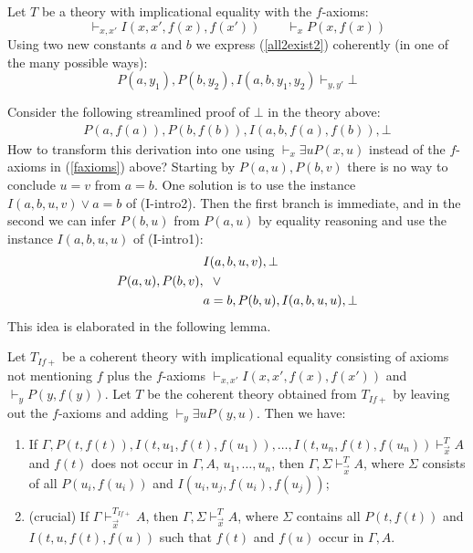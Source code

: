 \documentclass[10pt,a4paper]{article}
\begin{document}
\begin{example}\label{exa:counter2CL}
Let $T$  be a theory with implicational equality with the $f$-axioms:
\begin{equation}\label{faxioms}
\vdash_{x,x'} I(x,x',f(x),f(x') )\quad\quad \vdash_{x} P(x,f(x))
\end{equation}
Using two new constants $a$ and $b$ we express (\ref{all2exist2}) coherently
(in one of the many possible ways):
\[
P(a,y_1),P(b,y_2),I(a,b,y_1,y_2)  \vdash_{y,y'} \bot
\]

Consider the following streamlined proof of $\bot$ in the theory above:
\begin{align*}
P(a,f(a)), P(b,f(b)),I(a,b,f(a),f(b)),\bot
\end{align*}
How to transform this derivation into one using 
$\vdash_{x} \exists u P(x,u)$ instead of the $f$-axioms 
in (\ref{faxioms}) above? Starting by $P(a,u), P(b,v)$
there is no way to conclude $u=v$ from $a=b$.
One solution is to use the instance $I(a,b,u,v) \lor a=b$ of (I-intro2).
Then the first branch is immediate, and in the second
we can infer $P(b,u)$ from $P(a,u)$ by equality reasoning and use 
the instance $I(a,b,u,u)$ of (I-intro1):
\begin{align*}
&I(a,b,u,v),\bot\\
P(a,u),P(b,v),&{\hphantom w}\lor\\
& a=b,P(b,u),I(a,b,u,u),\bot\\
\end{align*}
This idea is elaborated in the following lemma.
\end{example}




\begin{lemma}\label{lem:main}
Let $T_{I\!f{+}}$ be a coherent theory with implicational equality consisting of
axioms not mentioning $f$ plus the $f$-axioms $\vdash_{x,x'} I(x,x',f(x),f(x'))$
and $\vdash_{{y}} P({y},f({y}))$. Let $T$ be the coherent theory obtained from 
$T_{I\!f{+}}$ by leaving out the $f$-axioms and adding $\vdash_{{y}} \exists u P({y},u)$.
Then we have:
\begin{enumerate}
\item If $\Gamma,P(t,f(t)), I(t,u_1,f(t),f(u_1)),\ldots,I(t,u_n,f(t),f(u_n))\vdash_{\vec{x}}^{T} A$
and $f(t)$ does not occur in $\Gamma,A$, $u_1,\ldots,u_n$, then  
$\Gamma,\Sigma\vdash_{\vec{x}}^{T} A$, where $\Sigma$ consists of 
all $P(u_i,f(u_i))$ and $I(u_i,u_j,f(u_i),f(u_j))$;
\item (crucial) If $\Gamma\vdash_{\vec{x}}^{T_{I\!f{+}}} A$, 
then $\Gamma,\Sigma\vdash_{\vec{x}}^{T} A$,
where $\Sigma$ contains all $P(t,f(t))$ and
$I(t,u,f(t),f(u))$ such that $f(t)$ and $f(u)$ occur in $\Gamma,A$.
\end{enumerate}
\end{lemma}
\end{document}
